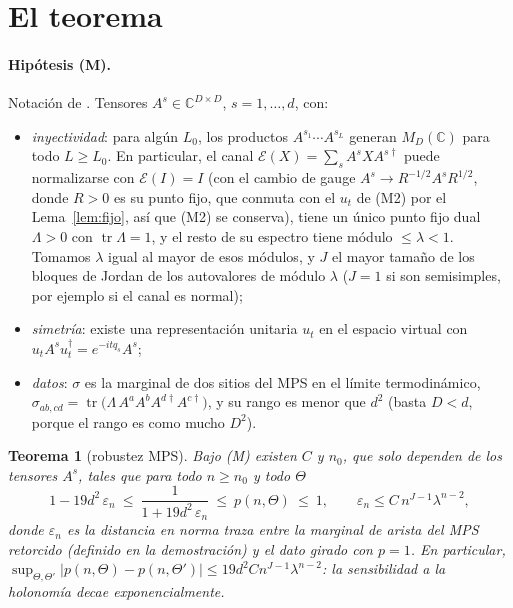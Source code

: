 \documentclass[11pt,a4paper]{article}
\newtheorem{teorema}{Teorema}
\theoremstyle{remark}
\newcommand{\tr}{\operatorname{tr}}
\begin{document}
\section{El teorema}\label{sec:teorema}

\paragraph{Hipótesis (M).} Notación de \cite{fnw,pvwc}. Tensores $A^s\in\mathbb C^{D\times D}$, $s=1,\dots,d$, con:
\begin{itemize}
\item[(M1)] \emph{inyectividad}: para algún $L_0$, los productos $A^{s_1}\cdots A^{s_L}$ generan
  $M_D(\mathbb C)$ para todo $L\ge L_0$. En particular, el canal
  $\mathcal E(X)=\sum_sA^sXA^{s\dagger}$ puede normalizarse con $\mathcal E(I)=I$ (con el cambio de
  gauge $A^s\to R^{-1/2}A^sR^{1/2}$, donde $R>0$ es su punto fijo, que conmuta con el $u_t$ de (M2)
  por el Lema~\ref{lem:fijo}, así que (M2) se conserva), tiene un único
  punto fijo dual $\Lambda>0$ con $\tr\Lambda=1$, y el resto de su espectro tiene módulo
  $\le\lambda<1$. Tomamos $\lambda$ igual al mayor de esos módulos, y $J$ el mayor tamaño de los
  bloques de Jordan de los autovalores de módulo $\lambda$ ($J=1$ si son semisimples, por ejemplo
  si el canal es normal);
\item[(M2)] \emph{simetría}: existe una representación unitaria $u_t$ en el espacio virtual
  \cite{sanz} con
  $u_tA^su_t^\dagger=e^{-itq_s}A^s$;
\item[(M3)] \emph{datos}: $\sigma$ es la marginal de dos sitios del MPS en el límite
  termodinámico, $\sigma_{ab,cd}=\tr\big(\Lambda\,A^aA^bA^{d\dagger}A^{c\dagger}\big)$, y su rango
  es menor que $d^2$ (basta $D<d$, porque el rango es como mucho $D^2$).
\end{itemize}

\begin{teorema}[robustez MPS]\label{teo:mps}
Bajo (M) existen $C$ y $n_0$, que solo dependen de los tensores $A^s$, tales que para todo
$n\ge n_0$ y todo $\Theta$
\[
  1-19d^2\,\varepsilon_n\ \le\ \frac1{1+19d^2\,\varepsilon_n}\ \le\ p(n,\Theta)\ \le\ 1,\qquad
  \varepsilon_n\le C\,n^{J-1}\lambda^{n-2},
\]
donde $\varepsilon_n$ es la distancia en norma traza entre la marginal de arista del MPS retorcido
(definido en la demostración) y el dato girado con $p=1$. En particular, $\sup_{\Theta,\Theta'}|p(n,\Theta)-p(n,\Theta')|\le19d^2Cn^{J-1}\lambda^{n-2}$: la
sensibilidad a la holonomía decae exponencialmente.
\end{teorema}
\end{document}

